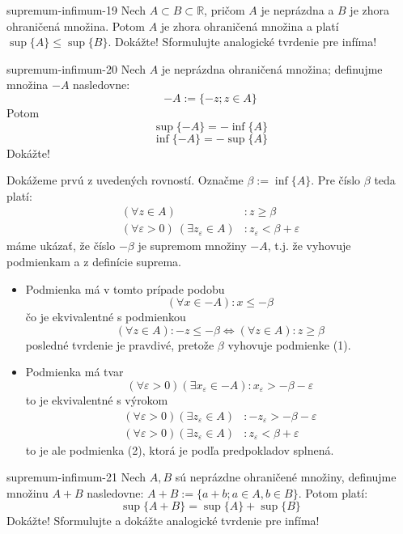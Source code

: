 \begin{defproblem}{supremum-infimum-19}
Nech $A \subset B \subset \mathbb{R}$, pričom $A$ je neprázdna a $B$ je zhora
ohraničená množina. Potom $A$ je zhora ohraničená množina a platí
$\sup\{A\} \leq \sup\{B\}$. Dokážte! Sformulujte analogické tvrdenie pre infíma!
\end{defproblem}

\begin{defproblem}{supremum-infimum-20}
Nech $A$ je neprázdna ohraničená množina; definujme množina $-A$ nasledovne:
$$-A := \{ -z; z \in A\}$$
Potom
$$\sup\{-A\} = -\inf\{A\}$$
$$\inf\{-A\} = -\sup\{A\}$$
Dokážte!

\begin{solution}
  Dokážeme prvú z uvedených rovností. Označme $\beta := \inf\{A\}$. Pre číslo
  $\beta$ teda platí:
  \begin{align*}
    (\forall z \in A)&: z \geq \beta \\
    (\forall \varepsilon > 0) \: (\exists z_\varepsilon \in A)&:
            z_\varepsilon < \beta + \varepsilon
  \end{align*}
  máme ukázať, že číslo $-\beta$ je supremom množiny $-A$, t.j. že vyhovuje
  podmienkam  a  z definície suprema.

  \begin{itemize}
    \item[\ding{34}]
      Podmienka má v tomto prípade podobu
      \[
        (\forall x \in -A): x \leq -\beta
      \]
      čo je ekvivalentné s podmienkou
      \[
        (\forall z \in A): -z \leq -\beta
        \iff
        (\forall z \in A): z \geq \beta
      \]
      posledné tvrdenie je pravdivé, pretože $\beta$ vyhovuje
      podmienke (1).
    \item[\ding{37}]
      Podmienka má tvar
      \[
        (\forall \varepsilon > 0) (\exists x_\varepsilon \in -A):
        x_\varepsilon > -\beta - \varepsilon
      \]
      to je ekvivalentné s výrokom
      \begin{align*}
        (\forall \varepsilon > 0) (\exists z_\varepsilon \in A)&:
        -z_\varepsilon > -\beta - \varepsilon \\
        (\forall \varepsilon > 0) (\exists z_\varepsilon \in A)&:
        z_\varepsilon < \beta + \varepsilon
      \end{align*}
      to je ale podmienka (2), ktorá je podľa predpokladov splnená.
  \end{itemize}
\end{solution}

\end{defproblem}

\begin{defproblem}{supremum-infimum-21}
Nech $A, B$ sú neprázdne ohraničené množiny, definujme množinu $A + B$
nasledovne: $A + B := \{ a + b ; a \in A, b \in B \}$. Potom platí:
$$\sup\{A + B\} = \sup\{A\} + \sup\{B\}$$
Dokážte! Sformulujte a dokážte analogické tvrdenie pre infíma!
\end{defproblem}
